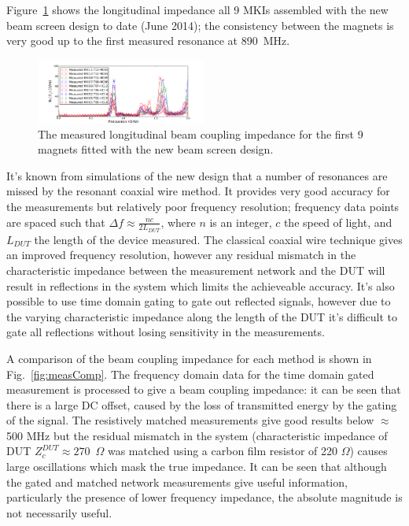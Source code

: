 \documentclass[a4paper,
              ]{jacow}
\begin{document}
Figure~\ref{fig:allNewMKIImp} shows the longitudinal impedance all 9 MKIs assembled with the new beam screen design to date (June 2014); the consistency between the magnets is very good up to the first measured resonance at 890~MHz. 

\begin{figure}
\includegraphics[width=0.5\textwidth]{TUPRI030f4.pdf}
\caption{The measured longitudinal beam coupling impedance for the first 9 magnets fitted with the new beam screen design.}
\label{fig:allNewMKIImp}
\end{figure}

It's known from simulations of the new design \cite{DayThesis} that a number of resonances are missed by the resonant coaxial wire method. It provides very good accuracy for the measurements but relatively poor frequency resolution; frequency data points are spaced such that $\Delta f \approx \frac{nc}{2L_{DUT}}$, where $n$ is an integer, $c$ the speed of light, and $L_{DUT}$ the length of the device measured. The classical coaxial wire technique gives an improved frequency resolution, however any residual mismatch in the characteristic impedance between the measurement network and the DUT will result in reflections in the system which limits the achieveable accuracy. It's also possible to use time domain gating to gate out reflected signals, however due to the varying characteristic impedance along the length of the DUT it's difficult to gate all reflections without losing sensitivity in the measurements.

A comparison of the beam coupling impedance for each method is shown in Fig.~\ref{fig:measComp}. The frequency domain data for the time domain gated measurement is processed to give a beam coupling impedance: it can be seen that there is a large DC offset, caused by the loss of transmitted energy by the gating of the signal. The resistively matched measurements give good results below $\approx$ 500 MHz but the residual mismatch in the system (characteristic impedance of DUT $Z_{c}^{DUT}\approx 270$~$\Omega$ was matched using a carbon film resistor of 220 $\Omega$) causes large oscillations which mask the true impedance. It can be seen that although the gated and matched network measurements give useful information, particularly the presence of lower frequency impedance, the absolute magnitude is not necessarily useful.
\end{document}
